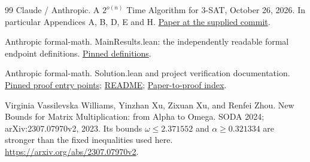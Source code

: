 \begin{thebibliography}{99}
 Claude / Anthropic. A $2^{o(n)}$ Time Algorithm for 3-SAT, October 26, 2026. In particular Appendices A, B, D, E and H. \href{https://github.com/anthropics/formal-math/blob/1a6eee293b9e00cb432eef6018a21f523623a9af/eth/paper.pdf}{Paper at the supplied commit}.

 Anthropic formal-math. MainResults.lean: the independently readable formal endpoint definitions. \href{https://github.com/anthropics/formal-math/blob/1a6eee293b9e00cb432eef6018a21f523623a9af/eth/MainResults.lean}{Pinned definitions}.

 Anthropic formal-math. Solution.lean and project verification documentation. \href{https://github.com/anthropics/formal-math/blob/1a6eee293b9e00cb432eef6018a21f523623a9af/eth/Solution.lean}{Pinned proof entry points}; \href{https://github.com/anthropics/formal-math/blob/1a6eee293b9e00cb432eef6018a21f523623a9af/eth/README.md}{README}; \href{https://github.com/anthropics/formal-math/blob/1a6eee293b9e00cb432eef6018a21f523623a9af/eth/proof/PaperIndex.lean}{Paper-to-proof index}.

 Virginia Vassilevska Williams, Yinzhan Xu, Zixuan Xu, and Renfei Zhou. New Bounds for Matrix Multiplication: from Alpha to Omega. SODA 2024; arXiv:2307.07970v2, 2023. Its bounds $\omega\le2.371552$ and $\alpha\ge0.321334$ are stronger than the fixed inequalities used here. \url{https://arxiv.org/abs/2307.07970v2}.

\end{thebibliography}
\endgroup

